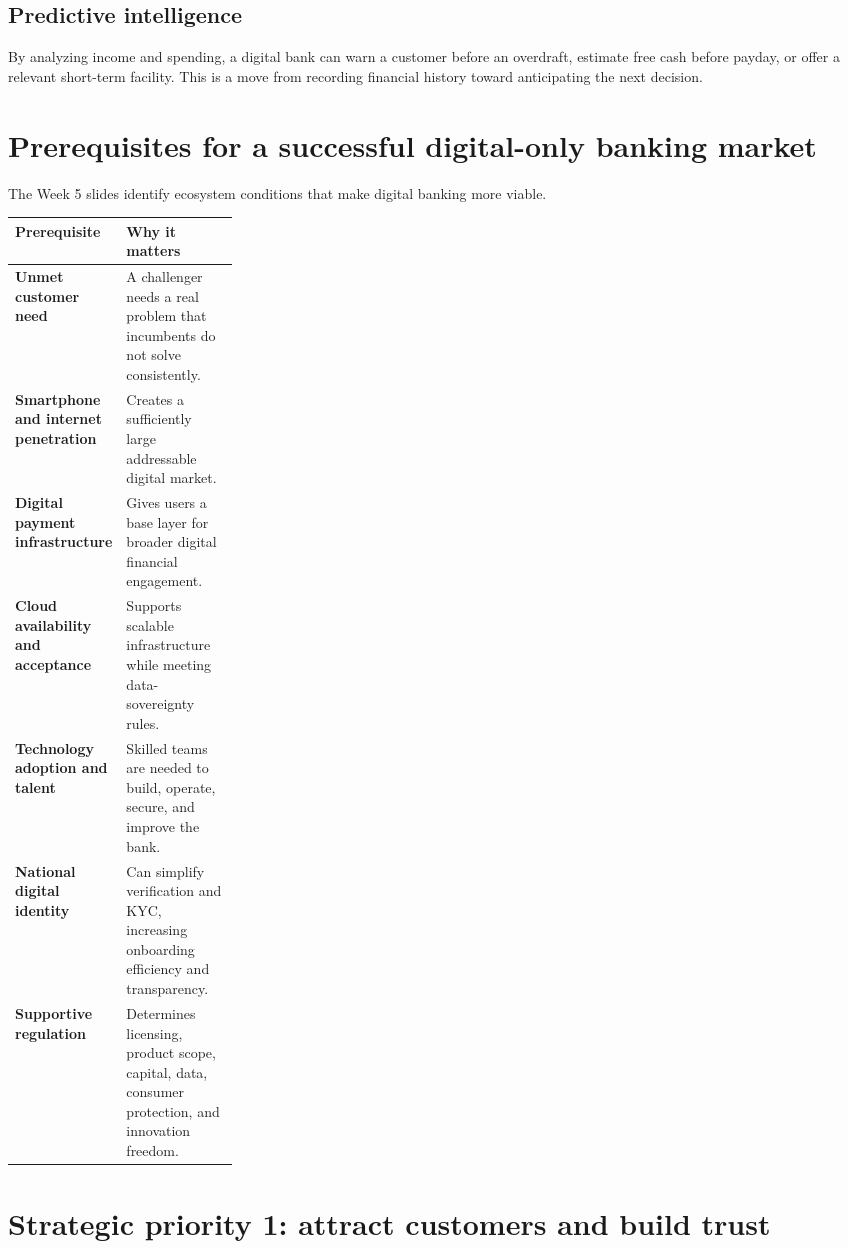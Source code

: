 \subsection{Predictive intelligence}

By analyzing income and spending, a digital bank can warn a customer before an overdraft, estimate free cash before payday, or offer a relevant short-term facility. This is a move from recording financial history toward anticipating the next decision.

\section{Prerequisites for a successful digital-only banking market}

The Week 5 slides identify ecosystem conditions that make digital banking more viable.

\begin{mltable}
\begin{tabularx}{\linewidth}{@{}>{\bfseries\leavevmode\color{MLNavy}}p{0.26\linewidth}X@{}}
\toprule
\rowcolor{MLPaleBlue!92}
Prerequisite & Why it matters \\
\midrule
Unmet customer need & A challenger needs a real problem that incumbents do not solve consistently. \\
Smartphone and internet penetration & Creates a sufficiently large addressable digital market. \\
Digital payment infrastructure & Gives users a base layer for broader digital financial engagement. \\
Cloud availability and acceptance & Supports scalable infrastructure while meeting data-sovereignty rules. \\
Technology adoption and talent & Skilled teams are needed to build, operate, secure, and improve the bank. \\
National digital identity & Can simplify verification and KYC, increasing onboarding efficiency and transparency. \\
Supportive regulation & Determines licensing, product scope, capital, data, consumer protection, and innovation freedom. \\
\bottomrule
\end{tabularx}
\end{mltable}

\section{Strategic priority 1: attract customers and build trust}

